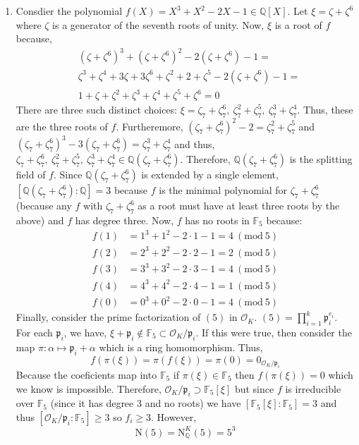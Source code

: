 \documentclass[12pt]{extarticle}
\newcommand{\Q}{\mathbb{Q}}
\newcommand{\finfield}[1]{\mathbb{F}_{#1}}
\newcommand{\ints}[1]{\mathcal{O}_{#1}}
\newcommand{\qnorm}[2]{\mathrm{N}^{#1}_{\Q}\left(#2\right)}
\newcommand{\pideal}{\mathfrak{p}}
\begin{document}
\begin{enumerate}
\begin{enumerate}
\item Consdier the polynomial $f(X) = X^3 + X^2 - 2X - 1 \in \Q[X]$. Let $\xi = \zeta + \zeta^6$ where $\zeta$ is a generator of the seventh roots of unity. Now, $\xi$ is a root of $f$ because,
\begin{align*}
& (\zeta + \zeta^6)^3 + (\zeta + \zeta^6)^2 - 2 (\zeta + \zeta^6) - 1  = \\
& \zeta^3 + \zeta^4 + 3 \zeta + 3 \zeta^6 + \zeta^2 + 2 + \zeta^5 - 2 (\zeta + \zeta^6) - 1 = \\
& 1 + \zeta + \zeta^2 + \zeta^3 + \zeta^4 + \zeta^5 + \zeta^6 = 0  
\end{align*}
There are three such distinct choices: $\xi = \zeta_7 + \zeta_7^6, \: \zeta_7^2 + \zeta_7^5, \: \zeta_7^3 + \zeta_7^4$. Thus, these are the three roots of $f$. Furtheremore, $(\zeta_7 + \zeta_7^6)^2 - 2 = \zeta_7^2 + \zeta_7^5$ and $(\zeta_7 + \zeta_7^6)^3 - 3(\zeta_7 + \zeta_7^6) = \zeta_7^3 + \zeta_7^4$ and thus, $\zeta_7 + \zeta_7^6, \: \zeta_7^2 + \zeta_7^5, \: \zeta_7^3 + \zeta_7^4 \in \Q(\zeta_7 + \zeta_7^6)$. Therefore, $\Q(\zeta_7 + \zeta_7^6)$ is the splitting field of $f$. Since $\Q(\zeta_7 + \zeta_7^6)$ is extended by a single element, $[\Q(\zeta_7 + \zeta_7^6) : \Q] = 3$ because $f$ is the minimal polynomial for $\zeta_7 + \zeta_7^6$ (because any $f$ with $\zeta_7 + \zeta_7^6$ as a root must have at least three roots by the above) and $f$ has degree three. Now, $f$ has no roots in $\finfield{5}$ because:
\begin{align*}
f(1) &= 1^3 + 1^2 - 2\cdot 1 - 1 = 4 \: (\mathrm{mod} \: 5) \\
f(2) &= 2^3 + 2^2 - 2\cdot 2 - 1 = 2 \: (\mathrm{mod} \: 5) \\
f(3) &= 3^3 + 3^2 - 2\cdot 3 - 1 = 4 \: (\mathrm{mod} \: 5) \\
f(4) &= 4^3 + 4^2 - 2\cdot 4 - 1 = 1 \: (\mathrm{mod} \: 5) \\
f(0) &= 0^3 + 0^2 - 2\cdot 0 - 1 = 4 \: (\mathrm{mod} \: 5)
\end{align*}
Finally, consider the prime factorization of $(5)$ in $\ints{K}$. $(5) = \prod\limits_{i = 1}^{k} \mathfrak{p}_i^{e_i}$. For each $\mathfrak{p}_i$, we have, $\xi + \mathfrak{p}_i \notin \finfield{5} \subset \ints{K}/\mathfrak{p}_i$. If this were true, then consider the map $\pi : \alpha \mapsto \mathfrak{p}_i + \alpha$ which is a ring homomorphism. Thus, \[f(\pi(\xi)) = \pi(f(\xi)) = \pi(0) = 0_{\ints{K}/\mathfrak{p}_i}\]
Because the coeficients map into $\finfield{5}$ if $\pi(\xi) \in \finfield{5}$ then $f(\pi(\xi)) = 0$ which we know is impossible. Therefore, $\ints{K}/\mathfrak{p}_i \supset \finfield{5}[\xi]$ but since $f$ is irreducible over $\finfield{5}$ (since it has degree 3 and no roots) we have $[\finfield{5} [\xi] : \finfield{5} ] = 3$ and thus $[\ints{K} / \pideal_i : \finfield{5} ] \ge 3$ so $f_i \ge 3$. However, \[\mathrm{N}(5) = \qnorm{K}{5} = 5^3\]

\end{enumerate}
\end{enumerate}
\end{document}
